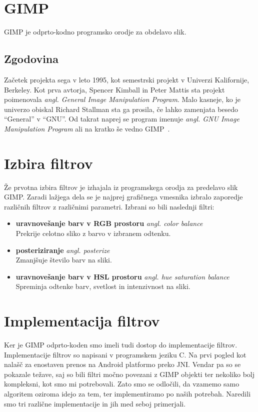 \section{GIMP}
GIMP je odprto-kodno programsko orodje za obdelavo slik.


\subsection{Zgodovina}
Začetek projekta sega v leto 1995, kot semestrski projekt v Univerzi
Kalifornije, Berkeley. Kot prva avtorja, Spencer Kimball in Peter Mattis sta
projekt poimenovala \textit{angl. General Image Manipulation Program}. Malo
kasneje, ko je univerzo obiskal Richard Stallman sta ga prosila, če lahko
zamenjata besedo ``General'' v ``GNU''. Od takrat naprej se program imenuje
\textit{angl. GNU Image Manipulation Program} ali na kratko še vedno
GIMP~\cite{wiki:GIMP}.


\section{Izbira filtrov}
Že prvotna izbira filtrov je izhajala iz programskega orodja za predelavo slik
GIMP. Zaradi lažjega dela se je najprej grafičnega vmesnika izbralo zaporedje
različnih filtrov z različnimi parametri. Izbrani so bili naslednji filtri:
\begin{itemize}
    \item \textbf{uravnovešanje barv v RGB prostoru} \textit{angl. color balance} \hfill \\
        Prekrije celotno sliko z barvo v izbranem odtenku.
    \item \textbf{posteriziranje} \textit{angl. posterize} \hfill \\
        Zmanjšuje število barv na sliki.
    \item \textbf{uravnovešanje barv v HSL prostoru} \textit{angl. hue saturation balance} \hfill \\
        Spreminja odtenke barv, svetlost in intenzivnost na sliki.
\end{itemize}


\section{Implementacija filtrov}
Ker je GIMP odprto-koden smo imeli tudi dostop do implementacije filtrov.
Implementacije filtrov so napisani v programskem jeziku C. Na prvi pogled kot
nalašč za enostaven prenos na Android platformo preko JNI. Vendar pa so se
pokazale težave, saj so bili filtri močno povezani z GIMP objekti ter nekoliko
bolj kompleksni, kot smo mi potrebovali. Zato smo se odločili, da vzamemo samo
algoritem oziroma idejo za tem, ter implementiramo po naših potrebah. Naredili
smo tri različne implementacije in jih med seboj primerjali.

